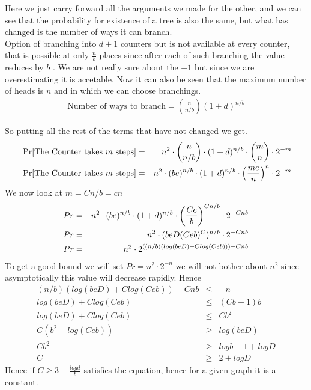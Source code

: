 \documentclass{assignment}
\begin{document}
\begin{problemlist}
\begin{problem}
\begin{answer}
\begin{enumerate}
Here we just carry forward all the arguments we made for the other, and we can see that the probability for existence of a tree is also the same, but what has changed is the number of ways it can branch. \\
Option of branching into $d+1$ counters but is not available at every counter, that is possible at only $\frac{n}{b}$ places since after each of such branching the value reduces by $b$ . We are not really sure about the $+1$ but since we are overestimating it is accetable. Now it can also be seen that the maximum number of heads is $n$ and in which we can choose branchings. 
\begin{eqnarray}
\text{Number of ways to branch} =  \binom {n}{n/b} (1+d)^{n/b}
\end{eqnarray}

So putting all the rest of the terms that have not changed we get. 
\begin{eqnarray}
\text{ Pr[The Counter takes $m$ steps]}& = & n^2 \cdot \binom{n}{n/b} \cdot (1+d)^{n/b} \cdot \binom {m}{n} \cdot 2^{-m} \\
\text{ Pr[The Counter takes $m$ steps]}& = & n^2 \cdot (be)^{n/b} \cdot (1+d)^{n/b} \cdot \left({me \over n}\right)^{n} \cdot 2^{-m} \\
\end{eqnarray}
We now look at $m=Cn/b=cn$
\begin{eqnarray}
Pr & = & n^2 \cdot (be)^{n/b} \cdot (1+d)^{n/b} \cdot \left({Ce \over b}\right)^{Cn/b} \cdot 2^{-Cnb} \\
Pr & =& n^2 \cdot (beD(Ceb)^C)^{n/b} \cdot 2^{-Cnb} \\
Pr & = & n^2 \cdot 2^{((n/b)(log(beD) + Clog(Ceb) )) - Cnb} 
\end{eqnarray}
To get a good bound we will set $Pr = n^2 \cdot 2^{-n}$ we will not bother about $n^2$ since asymptotically this value will decrease rapidly. Hence 
\begin{eqnarray}
(n/b)(log(beD) + Clog(Ceb) ) - Cnb &\leq& -n \\
log(beD) + Clog(Ceb) &\leq& (Cb-1)b \\
log(beD) + Clog(Ceb) &\leq& Cb^2 \\
C(b^2 - log (Ceb)) &\geq& log (beD) \\
Cb^2  &\geq& logb + 1 + logD \\
C &\geq& 2+logD
\end{eqnarray}
Hence if $C \geq 3+\frac{log d}{b}$ satisfies the equation, hence for a given graph it is a constant. 



\end{enumerate}

\end{answer}
\end{problem}
\end{problemlist}
\end{document}
